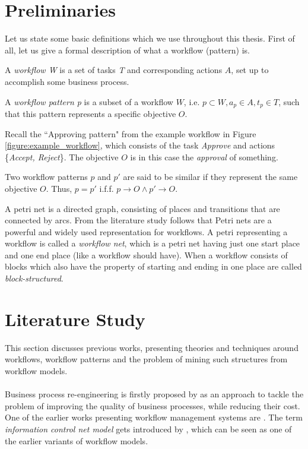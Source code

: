\documentclass[a4paper,11pt]{article}
\begin{document}
\section{Preliminaries}
Let us state some basic definitions which we use throughout this thesis.
First of all, let us give a formal description of what a workflow (pattern) is.
\begin{defn}[Workflow]
A \textit{workflow W} is a set of tasks \textit{T} and corresponding actions $A$, set up to accomplish some business process.
\end{defn}

\begin{defn}
A \textit{workflow pattern p} is a subset of a workflow $W$, i.e. $p \subset W, a_p \in A, t_p \in T$, such that this pattern represents a specific objective $O$.
\end{defn}
Recall the ``Approving pattern" from the example workflow in Figure \ref{figure:example_workflow}, which consists of the task \textit{Approve} and actions \{\textit{Accept, Reject}\}. The objective $O$ is in this case the \textit{approval} of something.

\begin{defn}
Two workflow patterns $p$ and $p'$ are said to be similar if they represent the same objective $O$. Thus, $p=p'$ i.f.f. $p \rightarrow O \wedge p' \rightarrow O$.
\end{defn}

\begin{defn}
A petri net is a directed graph, consisting of places and transitions that are connected by arcs. From the literature study follows that Petri nets are a powerful and widely used representation for workflows. A petri representing a workflow is called a \textit{workflow net}, which is a petri net having just one start place and one end place (like a workflow should have). When a workflow consists of blocks which also have the property of starting and ending in one place are called \textit{block-structured}. 
\end{defn}


\section{Literature Study}
\label{section:literature}
This section discusses previous works, presenting theories and techniques around workflows, workflow patterns and the problem of mining such structures from workflow models.\\
\\
Business process re-engineering is firstly proposed by \cite{AutomatingBusinessProcesses1990} as an approach to tackle the problem of improving the quality of business processes, while reducing their cost. One of the earlier works presenting workflow management systems are \cite{OfficeCommunicationsSystem79,OfficeInfoSystem1982}. The term \textit{information control net model} gets introduced by \cite{OfficeInfoSystem1982}, which can be seen as one of the earlier variants of workflow models. 
\end{document}
